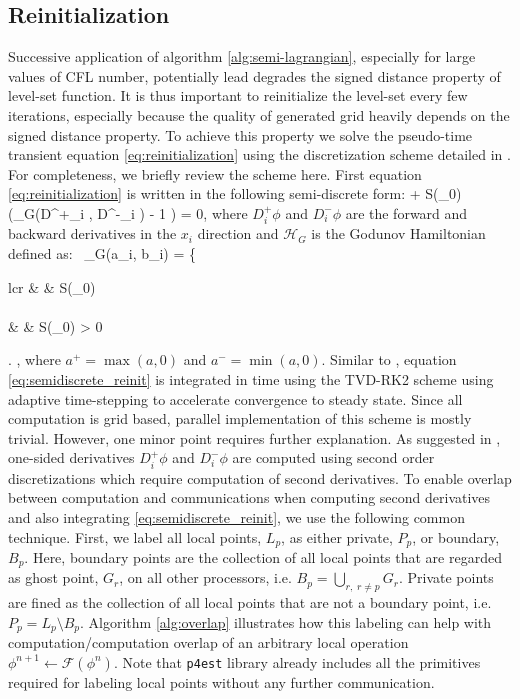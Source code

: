 \subsection{Reinitialization}
Successive application of algorithm \ref{alg:semi-lagrangian}, especially for large values of CFL number, potentially lead degrades the signed distance property of level-set function. It is thus important to reinitialize the level-set every few iterations, especially because the quality of generated grid heavily depends on the signed distance property. To achieve this property we solve the pseudo-time transient equation \eqref{eq:reinitialization} using the discretization scheme detailed in \cite{Min;Gibou:07:A-second-order-accur}. For completeness, we briefly review the scheme here. First equation \eqref{eq:reinitialization} is written in the following semi-discrete form:
\be
{} + S(\phi_0) \left(_G(D^+_i \phi, D^-_i \phi) - 1 \right) = 0,
\label{eq:semidiscrete_reinit}
\ee
where $D^+_i \phi$ and $D^-_i \phi$ are the forward and backward derivatives in the $x_i$ direction and $\mathcal{H}_G$ is the Godunov Hamiltonian defined as:\
\ben
{}_G(a_i, b_i) = 
\left\{
\begin{array}{lcr}
	 & \hspace {5 mm}  & S(\phi_0)  \\
	\\
	 & \hspace {5 mm}  & S(\phi_0)  >  0 
\end{array}
\right.
,
\een
where $a^+ = \max(a, 0)$ and $a^- = \min(a, 0)$. Similar to \cite{Min;Gibou:07:A-second-order-accur}, equation \eqref{eq:semidiscrete_reinit} is integrated in time using the TVD-RK2 scheme using adaptive time-stepping to accelerate convergence to steady state. Since all computation is grid based, parallel implementation of this scheme is mostly trivial. However, one minor point requires further explanation. As suggested in \cite{Min;Gibou:07:A-second-order-accur}, one-sided derivatives $D^+_i \phi$ and $D^-_i \phi$ are computed using second order discretizations which require computation of second derivatives. To enable overlap between computation and communications when computing second derivatives and also integrating \eqref{eq:semidiscrete_reinit}, we use the following common technique. First, we label all local points, $L_p$, as either private, $P_p$, or boundary, $B_p$. Here, boundary points are the collection of all local points that are regarded as ghost point, $G_r$, on all other processors, i.e. $B_p = \underset{r,\;r\neq p}{\bigcup} G_r$. Private points are fined as the collection of all local points that are not a boundary point, i.e. $P_p = L_p \setminus B_p$. Algorithm \ref{alg:overlap} illustrates how this labeling can help with computation/computation overlap of an arbitrary local operation $\phi^{n+1} \gets \mathcal{F}(\phi^n)$. Note that \texttt{p4est} library already includes all the primitives required for labeling local points without any further communication.

